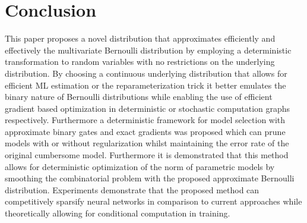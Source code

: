 \documentclass[final,1p,times]{elsarticle}
\begin{document}
\section{Conclusion}
This paper proposes a novel distribution that approximates efficiently and effectively the multivariate Bernoulli distribution by employing a deterministic transformation to random variables with no restrictions on the underlying distribution. By choosing a continuous underlying distribution that allows for efficient ML estimation or the reparameterization trick it better emulates the binary nature of Bernoulli distributions while enabling the use of efficient gradient based optimization in deterministic or stochastic computation graphs respectively. Furthermore a deterministic framework for model selection with approximate binary gates and exact gradients was proposed which can prune models with or without regularization whilst maintaining the error rate of the original cumbersome model. Furthermore it is demonstrated that this method allows for deterministic optimization of the  norm of parametric models by smoothing the combinatorial problem with the proposed approximate Bernoulli distribution. Experiments demonstrate that the proposed method can competitively sparsify neural networks in comparison to current approaches while theoretically allowing for conditional computation in training.




\end{document}
